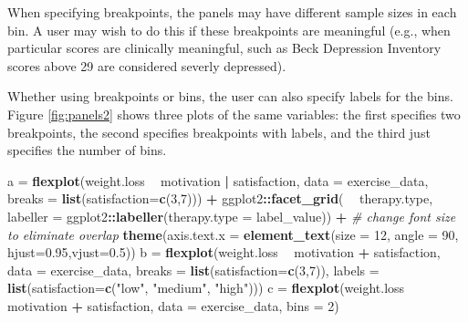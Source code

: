 \documentclass[
  man]{apa6}
\newenvironment{Shaded}{\begin{snugshade}}{\end{snugshade}}
\newcommand{\CommentTok}[1]{\textcolor[rgb]{0.56,0.35,0.01}{\textit{#1}}}
\newcommand{\DataTypeTok}[1]{\textcolor[rgb]{0.13,0.29,0.53}{#1}}
\newcommand{\DecValTok}[1]{\textcolor[rgb]{0.00,0.00,0.81}{#1}}
\newcommand{\FloatTok}[1]{\textcolor[rgb]{0.00,0.00,0.81}{#1}}
\newcommand{\KeywordTok}[1]{\textcolor[rgb]{0.13,0.29,0.53}{\textbf{#1}}}
\newcommand{\NormalTok}[1]{#1}
\newcommand{\OperatorTok}[1]{\textcolor[rgb]{0.81,0.36,0.00}{\textbf{#1}}}
\newcommand{\StringTok}[1]{\textcolor[rgb]{0.31,0.60,0.02}{#1}}
\begin{document}
When specifying breakpoints, the panels may have different sample sizes in each bin. A user may wish to do this if these breakpoints are meaningful (e.g., when particular scores are clinically meaningful, such as Beck Depression Inventory scores above 29 are considered severly depressed).

Whether using breakpoints or bins, the user can also specify labels for the bins. Figure \ref{fig:panels2} shows three plots of the same variables: the first specifies two breakpoints, the second specifies breakpoints with labels, and the third just specifies the number of bins.

\begin{Shaded}
\begin{Highlighting}[]
\NormalTok{a =}\StringTok{ }\KeywordTok{flexplot}\NormalTok{(weight.loss }\OperatorTok{~}\StringTok{ }\NormalTok{motivation }\OperatorTok{|}\StringTok{ }\NormalTok{satisfaction, }
             \DataTypeTok{data =}\NormalTok{ exercise_data, }
             \DataTypeTok{breaks =} \KeywordTok{list}\NormalTok{(}\DataTypeTok{satisfaction=}\KeywordTok{c}\NormalTok{(}\DecValTok{3}\NormalTok{,}\DecValTok{7}\NormalTok{))) }\OperatorTok{+}
\StringTok{  }\NormalTok{ggplot2}\OperatorTok{::}\KeywordTok{facet_grid}\NormalTok{( }\OperatorTok{~}\StringTok{ }\NormalTok{therapy.type, }
              \DataTypeTok{labeller =}\NormalTok{ ggplot2}\OperatorTok{::}\KeywordTok{labeller}\NormalTok{(}\DataTypeTok{therapy.type =}\NormalTok{ label_value)) }\OperatorTok{+}
\StringTok{  }\CommentTok{# change font size to eliminate overlap}
\StringTok{    }\KeywordTok{theme}\NormalTok{(}\DataTypeTok{axis.text.x =} 
            \KeywordTok{element_text}\NormalTok{(}\DataTypeTok{size =} \DecValTok{12}\NormalTok{, }\DataTypeTok{angle =} \DecValTok{90}\NormalTok{, }\DataTypeTok{hjust=}\FloatTok{0.95}\NormalTok{,}\DataTypeTok{vjust=}\FloatTok{0.5}\NormalTok{))}
\NormalTok{b =}\StringTok{ }\KeywordTok{flexplot}\NormalTok{(weight.loss }\OperatorTok{~}\StringTok{ }\NormalTok{motivation }\OperatorTok{+}\StringTok{ }\NormalTok{satisfaction, }
             \DataTypeTok{data =}\NormalTok{ exercise_data, }
             \DataTypeTok{breaks =} \KeywordTok{list}\NormalTok{(}\DataTypeTok{satisfaction=}\KeywordTok{c}\NormalTok{(}\DecValTok{3}\NormalTok{,}\DecValTok{7}\NormalTok{)), }
             \DataTypeTok{labels =} \KeywordTok{list}\NormalTok{(}\DataTypeTok{satisfaction=}\KeywordTok{c}\NormalTok{(}\StringTok{"low"}\NormalTok{, }\StringTok{"medium"}\NormalTok{, }\StringTok{"high"}\NormalTok{)))}
\NormalTok{c =}\StringTok{ }\KeywordTok{flexplot}\NormalTok{(weight.loss }\OperatorTok{~}\StringTok{ }\NormalTok{motivation }\OperatorTok{+}\StringTok{ }\NormalTok{satisfaction, }
             \DataTypeTok{data =}\NormalTok{ exercise_data, }
             \DataTypeTok{bins =} \DecValTok{2}\NormalTok{) }
\end{Highlighting}
\end{Shaded}
\end{document}
